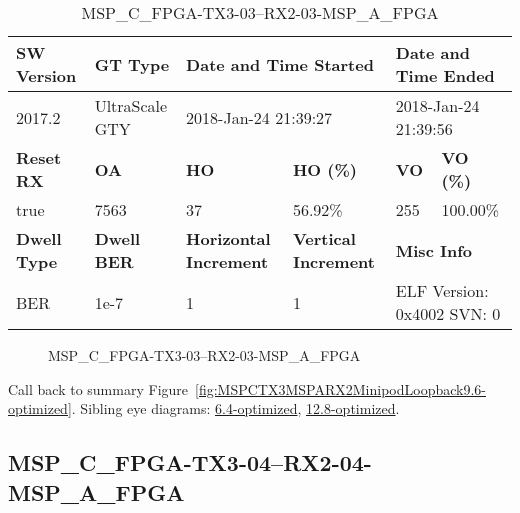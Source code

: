 \begin{table}[h]
\centering
\caption{MSP\_C\_FPGA-TX3-03--RX2-03-MSP\_A\_FPGA}
\label{tab:MSPCFPGATX303RX203MSPAFPGA9.6-optimized}
\begin{tabular}{@{}|l|l|l|l|l|l|@{}}
\toprule
\textbf{SW Version}                & \textbf{GT Type}   & \multicolumn{2}{l|}{\textbf{Date and Time Started}}            & \multicolumn{2}{l|}{\textbf{Date and Time Ended}}        \\ \midrule
2017.2                       & UltraScale GTY          & \multicolumn{2}{l|}{2018-Jan-24 21:39:27}                   & \multicolumn{2}{l|}{2018-Jan-24 21:39:56}               \\ \midrule
\textbf{Reset RX}                  & \textbf{OA} & \textbf{HO}   & \textbf{HO (\%)} & \textbf{VO} & \textbf{VO (\%)} \\ \midrule
true & 7563        & 37          & 56.92\%        & 255        & 100.00\%       \\ \midrule
\textbf{Dwell Type}                & \textbf{Dwell BER} & \textbf{Horizontal Increment} & \textbf{Vertical Increment}    & \multicolumn{2}{l|}{\textbf{Misc Info}}                  \\ \midrule
BER                            & 1e-7        & 1        & 1           & \multicolumn{2}{l|}{ELF Version: 0x4002 SVN: 0}                         \\ \bottomrule
\end{tabular}
\end{table}

\begin{figure}[h]
\caption{MSP\_C\_FPGA-TX3-03--RX2-03-MSP\_A\_FPGA} \label{fig:MSPCFPGATX303RX203MSPAFPGA9.6-optimized}
\end{figure}

Call back to summary Figure~\ref{fig:MSPCTX3MSPARX2MinipodLoopback9.6-optimized}.
Sibling eye diagrams: \hyperref[sec:MSPCFPGATX303RX203MSPAFPGA6.4-optimized]{6.4-optimized}, \hyperref[sec:MSPCFPGATX303RX203MSPAFPGA12.8-optimized]{12.8-optimized}.

\clearpage
\newpage


\subsection{MSP\_C\_FPGA-TX3-04--RX2-04-MSP\_A\_FPGA}\label{sec:MSPCFPGATX304RX204MSPAFPGA9.6-optimized}


